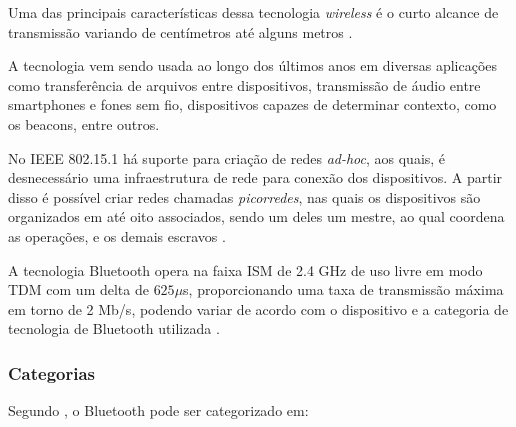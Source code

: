 Uma das principais características dessa tecnologia \textit{wireless} é o curto alcance de transmissão variando de centímetros até alguns metros \cite{Huang2007}. 

A tecnologia vem sendo usada ao longo dos últimos anos em diversas aplicações como transferência de arquivos entre dispositivos, transmissão de áudio entre smartphones e fones sem fio, dispositivos capazes de determinar contexto, como os beacons, entre outros.

No IEEE 802.15.1 há suporte para criação de redes \textit{ad-hoc}, aos quais, é desnecessário uma infraestrutura de rede para conexão dos dispositivos. A partir disso é possível criar redes chamadas \textit{picorredes}, nas quais os dispositivos são organizados em até oito associados, sendo um deles um mestre, ao qual coordena as operações, e os demais escravos \cite{BluetoothSIG2017}.

A tecnologia Bluetooth opera na faixa ISM de 2.4 GHz de uso livre em modo TDM com um delta de $625\mu$s, proporcionando uma taxa de transmissão máxima em torno de 2 Mb/s, podendo variar de acordo com o dispositivo e a categoria de tecnologia de Bluetooth utilizada \cite{BluetoothSIG2017}.


\subsubsection{Categorias}

Segundo \citeauthor{BluetoothSIG2017}, o Bluetooth pode ser categorizado em:

